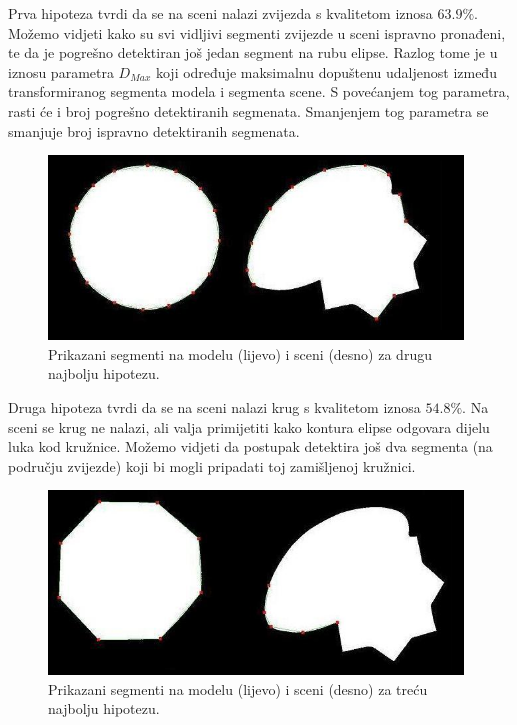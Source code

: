 \documentclass[lmodern, utf8, seminar, numeric]{fer}
\begin{document}
Prva hipoteza tvrdi da se na sceni nalazi zvijezda s kvalitetom iznosa $63.9\%$.
Možemo vidjeti kako su svi vidljivi segmenti zvijezde u sceni ispravno
pronađeni, te da je pogrešno detektiran još jedan segment na rubu elipse. Razlog
tome je u iznosu parametra $D_{Max}$ koji određuje maksimalnu dopuštenu udaljenost
između transformiranog segmenta modela i segmenta scene. S povećanjem tog
parametra, rasti će i broj pogrešno detektiranih segmenata. Smanjenjem tog
parametra se smanjuje broj ispravno detektiranih segmenata.

\begin{figure}[!h]
\begin{center}
\includegraphics[width=11cm]{resources/krug-spoj.png}
\end{center}
\caption{Prikazani segmenti na modelu (lijevo) i sceni (desno) za drugu najbolju hipotezu.} 
\label{fig:segmenti-druga-naj}
\end{figure}

Druga hipoteza tvrdi da se na sceni nalazi krug s kvalitetom iznosa $54.8\%$. Na
sceni se krug ne nalazi, ali valja primijetiti kako kontura elipse odgovara
dijelu luka kod kružnice. Možemo vidjeti da postupak detektira još dva segmenta
(na području zvijezde) koji bi mogli pripadati toj zamišljenoj kružnici.

\begin{figure}[!h]
\begin{center}
\includegraphics[width=11cm]{resources/oktagon-spoj.png}
\end{center}
\caption{Prikazani segmenti na modelu (lijevo) i sceni (desno) za treću najbolju hipotezu.} 
\label{fig:segmenti-treca}
\end{figure}
\end{document}
